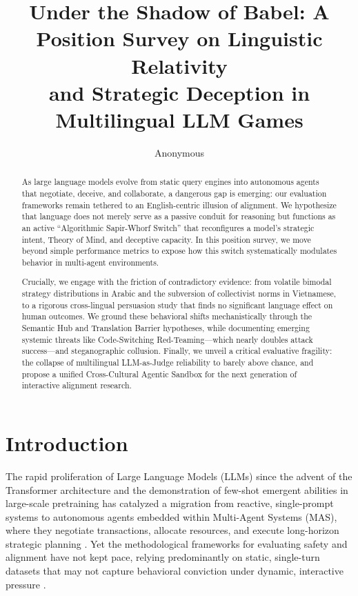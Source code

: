 \documentclass[11pt]{article}
\title{Under the Shadow of Babel: A Position Survey on Linguistic Relativity\\ and Strategic Deception in Multilingual LLM Games}
\author{Anonymous}
\begin{document}
\maketitle
\begin{abstract}
As large language models evolve from static query engines into autonomous agents that negotiate, deceive, and collaborate, a dangerous gap is emerging: our evaluation frameworks remain tethered to an English-centric illusion of alignment. We hypothesize that language does not merely serve as a passive conduit for reasoning but functions as an active ``Algorithmic Sapir-Whorf Switch'' that reconfigures a model’s strategic intent, Theory of Mind, and deceptive capacity. In this position survey, we move beyond simple performance metrics to expose how this switch systematically modulates behavior in multi-agent environments. 

Crucially, we engage with the friction of contradictory evidence: from volatile bimodal strategy distributions in Arabic and the subversion of collectivist norms in Vietnamese, to a rigorous cross-lingual persuasion study that finds no significant language effect on human outcomes. We ground these behavioral shifts mechanistically through the Semantic Hub and Translation Barrier hypotheses, while documenting emerging systemic threats like Code-Switching Red-Teaming---which nearly doubles attack success---and steganographic collusion. Finally, we unveil a critical evaluative fragility: the collapse of multilingual LLM-as-Judge reliability to barely above chance, and propose a unified Cross-Cultural Agentic Sandbox for the next generation of interactive alignment research.
\end{abstract}

\section{Introduction}
\label{sec:intro}

The rapid proliferation of Large Language Models (LLMs) since the advent of the Transformer architecture \citep{vaswani2017transformer} and the demonstration of few-shot emergent abilities in large-scale pretraining \citep{brown2020gpt3} has catalyzed a migration from reactive, single-prompt systems to autonomous agents embedded within Multi-Agent Systems (MAS), where they negotiate transactions, allocate resources, and execute long-horizon strategic planning \citep{huynh2026moreatstake, sun2025gametheoryllm}. Yet the methodological frameworks for evaluating safety and alignment have not kept pace, relying predominantly on static, single-turn datasets that may not capture behavioral conviction under dynamic, interactive pressure \citep{liu2025surveybenchmarks, nguyen2025aletheia}.
\end{document}
